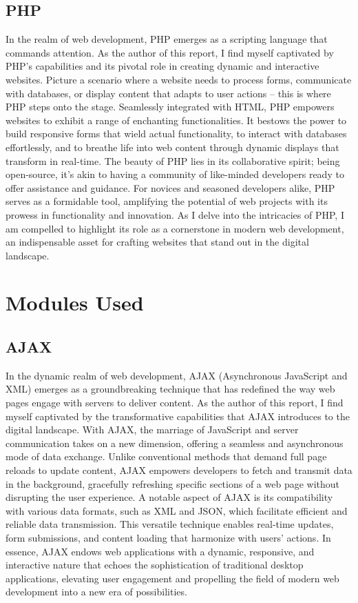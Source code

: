 \subsection{PHP}
In the realm of web development, PHP emerges as a scripting language that commands attention. As the author of this report, I find myself captivated by PHP's capabilities and its pivotal role in creating dynamic and interactive websites. Picture a scenario where a website needs to process forms, communicate with databases, or display content that adapts to user actions – this is where PHP steps onto the stage. Seamlessly integrated with HTML, PHP empowers websites to exhibit a range of enchanting functionalities. It bestows the power to build responsive forms that wield actual functionality, to interact with databases effortlessly, and to breathe life into web content through dynamic displays that transform in real-time. The beauty of PHP lies in its collaborative spirit; being open-source, it's akin to having a community of like-minded developers ready to offer assistance and guidance. For novices and seasoned developers alike, PHP serves as a formidable tool, amplifying the potential of web projects with its prowess in functionality and innovation. As I delve into the intricacies of PHP, I am compelled to highlight its role as a cornerstone in modern web development, an indispensable asset for crafting websites that stand out in the digital landscape.
\section{Modules Used}
\subsection{AJAX}
In the dynamic realm of web development, AJAX (Asynchronous JavaScript and XML) emerges as a groundbreaking technique that has redefined the way web pages engage with servers to deliver content. As the author of this report, I find myself captivated by the transformative capabilities that AJAX introduces to the digital landscape. With AJAX, the marriage of JavaScript and server communication takes on a new dimension, offering a seamless and asynchronous mode of data exchange. Unlike conventional methods that demand full page reloads to update content, AJAX empowers developers to fetch and transmit data in the background, gracefully refreshing specific sections of a web page without disrupting the user experience. A notable aspect of AJAX is its compatibility with various data formats, such as XML and JSON, which facilitate efficient and reliable data transmission. This versatile technique enables real-time updates, form submissions, and content loading that harmonize with users' actions. In essence, AJAX endows web applications with a dynamic, responsive, and interactive nature that echoes the sophistication of traditional desktop applications, elevating user engagement and propelling the field of modern web development into a new era of possibilities.
